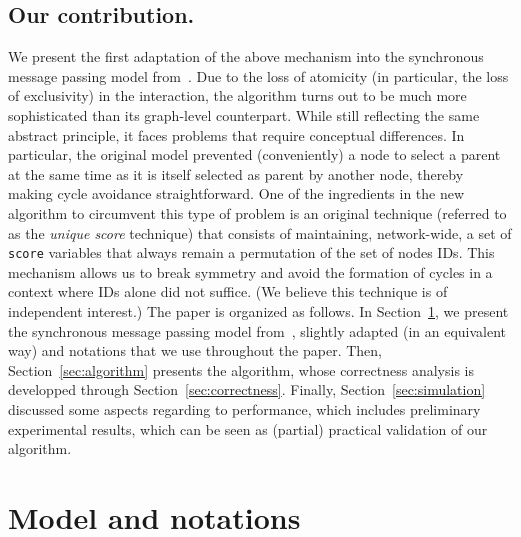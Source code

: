 \documentclass[twocolumn]{article}
\begin{document}
\subsection{Our contribution.}

We present the first adaptation of the above mechanism into the synchronous message passing model from~\cite{KLO10}. Due to the loss of atomicity (in particular, the loss of exclusivity) in the interaction, the algorithm turns out to be much more sophisticated than its graph-level counterpart. While still reflecting the same abstract principle, it faces problems that require conceptual differences. In particular, the original model prevented (conveniently) a node to select a parent at the same time as it is itself selected as parent by another node, thereby making cycle avoidance straightforward. One of the ingredients in the new algorithm to circumvent this type of problem is an original technique (referred to as the {\em unique score} technique) that consists of maintaining, network-wide, a set of {\tt score} variables that always remain a permutation of the set of nodes IDs. This mechanism allows us to break symmetry and avoid the formation of cycles in a context where IDs alone did not suffice. (We believe this technique is of independent interest.)
The paper is organized as follows. In Section~\ref{sec:model}, we present the synchronous message passing model from~\cite{KLO10}, slightly adapted (in an equivalent way) and notations that we use throughout the paper. Then, Section~\ref{sec:algorithm} presents the algorithm, whose correctness analysis is developped through Section~\ref{sec:correctness}. Finally, Section~\ref{sec:simulation} discussed some aspects regarding to performance, which includes preliminary experimental results, which can be seen as (partial) practical validation of our algorithm.


\section{Model and notations}
\label{sec:model}
\end{document}
